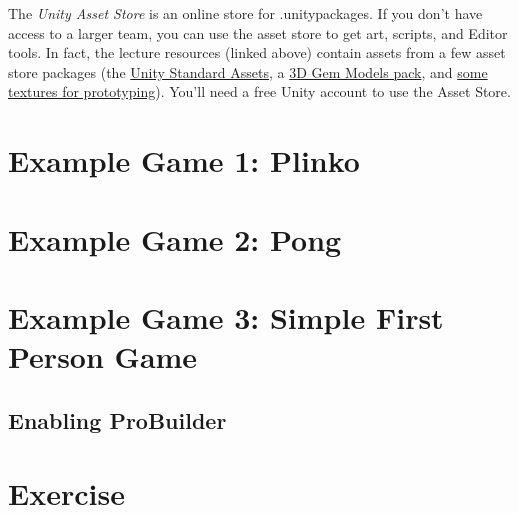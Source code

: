 \documentclass[11pt]{article}
\begin{document}
The \textit{Unity Asset Store} is an online store for .unitypackages.  If you don't have access to a larger team, you can use the asset store to get art, scripts, and Editor tools.  In fact, the lecture resources (linked above) contain assets from a few asset store packages (the \href{https://assetstore.unity.com/packages/essentials/asset-packs/standard-assets-32351}{Unity Standard Assets}, a \href{https://assetstore.unity.com/packages/3d/props/3d-crystal-gems-pack-112381}{3D Gem Models pack}, and \href{https://assetstore.unity.com/packages/2d/textures-materials/gridbox-prototype-materials-129127}{some textures for prototyping}).  You'll need a free Unity account to use the Asset Store.

\section{Example Game 1: Plinko}

\section{Example Game 2: Pong}

\section{Example Game 3: Simple First Person Game}

\subsection{Enabling ProBuilder}



\section{Exercise}
\end{document}
